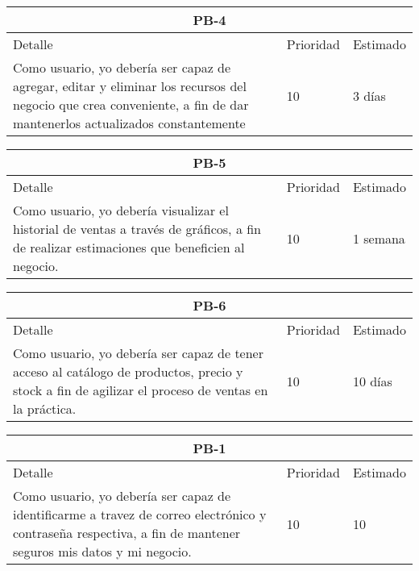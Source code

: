 \begin{table}[htbp]
	\begin{center}
		\begin{tabular}{|p{10cm} | p{2cm} | p{2cm}|}
			\hline
			\multicolumn{3}{|c|}{PB-4}\\
			\hline
			Detalle & Prioridad & Estimado \\
			\hline
			Como usuario, yo debería ser capaz de agregar, editar y eliminar los recursos del negocio que crea conveniente, a fin de dar mantenerlos actualizados constantemente& 10 & 3 días \\
			\hline	
		\end{tabular}
	\end{center}
\end{table}

\begin{table}[htbp]
	\begin{center}
		\begin{tabular}{|p{10cm} | p{2cm} | p{2cm}|}
			\hline
			\multicolumn{3}{|c|}{PB-5}\\
			\hline
			Detalle & Prioridad & Estimado \\
			\hline
			Como usuario, yo debería visualizar el historial de ventas a través de gráficos, a fin de realizar estimaciones que beneficien al negocio. & 10 & 1 semana \\
			\hline	
		\end{tabular}
	\end{center}
\end{table}

\begin{table}[htbp]
	\begin{center}
		\begin{tabular}{|p{10cm} | p{2cm} | p{2cm}|}
			\hline
			\multicolumn{3}{|c|}{PB-6}\\
			\hline
			Detalle & Prioridad & Estimado \\
			\hline
			Como usuario, yo debería ser capaz de tener acceso al catálogo de productos, precio y stock a fin de agilizar el proceso de ventas en la práctica. & 10 & 10 días \\
			\hline	
		\end{tabular}
	\end{center}
\end{table}

\begin{table}
	\begin{center}
		\begin{tabular}{|p{10cm} | p{2cm} | p{2cm}|}
			\hline
			\multicolumn{3}{|c|}{PB-1}\\
			\hline
			Detalle & Prioridad & Estimado \\
			\hline
			Como usuario, yo debería ser capaz de identificarme a travez de correo electrónico y contraseña respectiva, a fin de mantener seguros mis datos y mi negocio.  & 10 & 10 \\
			\hline	
		\end{tabular}
	\end{center}
\end{table}
